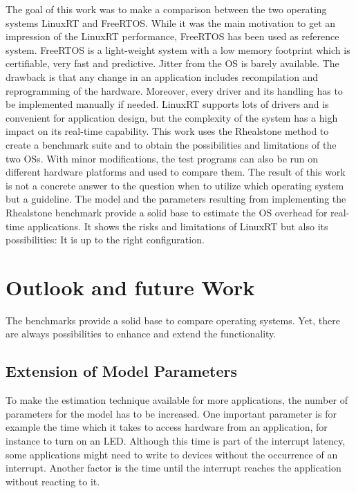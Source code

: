 The goal of this work was to make a comparison between the two operating systems LinuxRT and FreeRTOS. 
While it was the main motivation to get an impression of the LinuxRT performance, FreeRTOS has been used as reference system.
FreeRTOS is a light-weight system with a low memory footprint which is certifiable, very fast and predictive. 
Jitter from the \ac{OS} is barely available. 
The drawback is that any change in an application includes recompilation and reprogramming of the hardware.
Moreover, every driver and its handling has to be implemented manually if needed.
LinuxRT supports lots of drivers and is convenient for application design, but the complexity of the system has a high impact on its real-time capability.
This work uses the Rhealstone method to create a benchmark suite and to obtain the possibilities and limitations of the two \acp{OS}.
With minor modifications, the test programs can also be run on different hardware platforms and used to compare them.
The result of this work is not a concrete answer to the question when to utilize which operating system but a guideline.
The model and the parameters resulting from implementing the Rhealstone benchmark provide a solid base to estimate the \ac{OS} overhead for real-time applications. 
It shows the risks and limitations of LinuxRT but also its possibilities: It is up to the right configuration. 

\section{Outlook and future Work}
The benchmarks provide a solid base to compare operating systems.
Yet, there are always possibilities to enhance and extend the functionality.

\subsection{Extension of Model Parameters}
To make the estimation technique available for more applications, the number of parameters for the model has to be increased. 
One important parameter is for example the time which it takes to access hardware from an application, for instance to turn on an \ac{LED}. 
Although this time is part of the interrupt latency, some applications might need to write to devices without the occurrence of an interrupt.
Another factor is the time until the interrupt reaches the application without reacting to it. 

